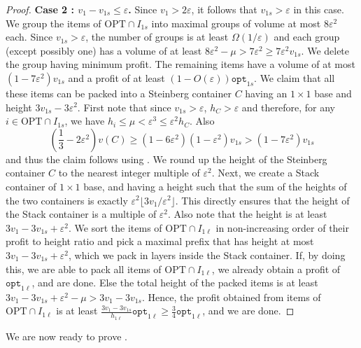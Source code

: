 \documentclass[10pt,a4paper]{amsart}
\renewcommand{\epsilon}{\varepsilon} %
\theoremstyle{definition}
\newcommand{\optonel}{\mathtt{opt}_{1\ell}}
\newcommand{\optones}{\mathtt{opt}_{1s}}
\newcommand{\honel}{h_{1\ell}}
\newcommand{\vones}{v_{1s}}
\begin{document}
\begin{proof}
    \textbf{Case 2 : $v_1 - \vones \le \epsilon$.} Since $v_1 > 2\epsilon$, it follows that $\vones > \epsilon$ in this case. We group the items of $\text{OPT}\cap I_{1s}$ into maximal groups of volume at most $8\epsilon^2$ each. Since $\vones > \epsilon$, the number of groups is at least $\Omega(1/\epsilon)$ and each group (except possibly one) has a volume of at least $8\epsilon^2-\mu>7\epsilon^2\ge 7\epsilon^2 \vones$. We delete the group having minimum profit. The remaining items have a volume of at most $(1-7\epsilon^2)\vones$ and a profit of at least $(1-O(\epsilon))\optones$. We claim that all these items can be packed into a Steinberg container $C$ having an $1\times 1$ base and height $3\vones-3\epsilon^2$. First note that since $\vones >\epsilon$, $h_C >\epsilon$ and therefore, for any $i\in \text{OPT}\cap I_{1s}$, we have $h_i \le \mu < \epsilon^3 \le \epsilon^2 h_C$. Also
    \[ \left(\frac{1}{3}-2\epsilon^2\right)v(C) \ge (1-6\epsilon^2)(1-\epsilon^2)\vones > (1-7\epsilon^2)\vones\]
    and thus the claim follows using . We round up the height of the Steinberg container $C$ to the nearest integer multiple of $\epsilon^2$. Next, we create a Stack container of $1\times 1$ base, and having a height such that the sum of the heights of the two containers is exactly $\epsilon^2\lfloor 3v_1/\epsilon^2\rfloor$. This directly ensures that the height of the Stack container is a multiple of $\epsilon^2$. Also note that the height is at least $3v_1-3\vones + \epsilon^2$. We sort the items of $\text{OPT}\cap I_{1\ell}$ in non-increasing order of their profit to height ratio and pick a maximal prefix that has height at most $3v_1-3\vones+\epsilon^2$, which we pack in layers inside the Stack container. If, by doing this, we are able to pack all items of $\text{OPT}\cap I_{1\ell}$, we already obtain a profit of $\optonel$, and are done. Else the total height of the packed items is at least $3v_1-3\vones+\epsilon^2-\mu > 3v_1-3\vones$. Hence, the profit obtained from items of $\text{OPT}\cap I_{1\ell}$ is at least $\frac{3v_1-3\vones}{\honel}\optonel \ge \frac{3}{4}\optonel$, and we are done.
\end{proof}

We are now ready to prove .
\end{document}
